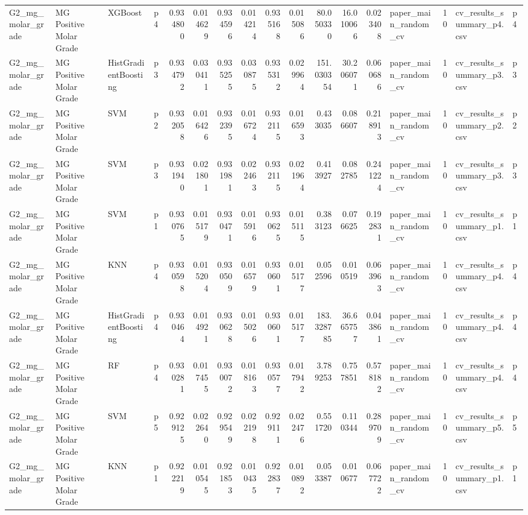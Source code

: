 \begin{tabular}{llllrrrrrrrrrlrll}
G2_mg_molar_grade & MG Positive Molar Grade & XGBoost & p4 & 0.934800 & 0.014629 & 0.934596 & 0.014214 & 0.935168 & 0.015086 & 80.050330 & 16.010066 & 0.023408 & paper_main_random_cv & 10 & cv_results_summary_p4.csv & p4 \\
G2_mg_molar_grade & MG Positive Molar Grade & HistGradientBoosting & p3 & 0.934792 & 0.030411 & 0.935255 & 0.030875 & 0.935312 & 0.029964 & 151.030354 & 30.206071 & 0.060686 & paper_main_random_cv & 10 & cv_results_summary_p3.csv & p3 \\
G2_mg_molar_grade & MG Positive Molar Grade & SVM & p2 & 0.932058 & 0.016426 & 0.932395 & 0.016724 & 0.932115 & 0.016593 & 0.433035 & 0.086607 & 0.218913 & paper_main_random_cv & 10 & cv_results_summary_p2.csv & p2 \\
G2_mg_molar_grade & MG Positive Molar Grade & SVM & p3 & 0.931940 & 0.021801 & 0.931981 & 0.022463 & 0.932115 & 0.021964 & 0.413927 & 0.082785 & 0.241224 & paper_main_random_cv & 10 & cv_results_summary_p3.csv & p3 \\
G2_mg_molar_grade & MG Positive Molar Grade & SVM & p1 & 0.930765 & 0.015179 & 0.930471 & 0.015916 & 0.930625 & 0.015115 & 0.383123 & 0.076625 & 0.192831 & paper_main_random_cv & 10 & cv_results_summary_p1.csv & p1 \\
G2_mg_molar_grade & MG Positive Molar Grade & KNN & p4 & 0.930598 & 0.015204 & 0.930509 & 0.016579 & 0.930601 & 0.015177 & 0.052596 & 0.010519 & 0.063963 & paper_main_random_cv & 10 & cv_results_summary_p4.csv & p4 \\
G2_mg_molar_grade & MG Positive Molar Grade & HistGradientBoosting & p4 & 0.930464 & 0.014921 & 0.930628 & 0.015026 & 0.930601 & 0.015177 & 183.328785 & 36.665757 & 0.043861 & paper_main_random_cv & 10 & cv_results_summary_p4.csv & p4 \\
G2_mg_molar_grade & MG Positive Molar Grade & RF & p4 & 0.930281 & 0.017455 & 0.930072 & 0.018163 & 0.930577 & 0.017942 & 3.789253 & 0.757851 & 0.578182 & paper_main_random_cv & 10 & cv_results_summary_p4.csv & p4 \\
G2_mg_molar_grade & MG Positive Molar Grade & SVM & p5 & 0.929125 & 0.022640 & 0.929549 & 0.022198 & 0.929111 & 0.022476 & 0.551720 & 0.110344 & 0.289709 & paper_main_random_cv & 10 & cv_results_summary_p5.csv & p5 \\
G2_mg_molar_grade & MG Positive Molar Grade & KNN & p1 & 0.922219 & 0.010545 & 0.921853 & 0.010435 & 0.922837 & 0.010892 & 0.053387 & 0.010677 & 0.067722 & paper_main_random_cv & 10 & cv_results_summary_p1.csv & p1 \\

\end{tabular}
